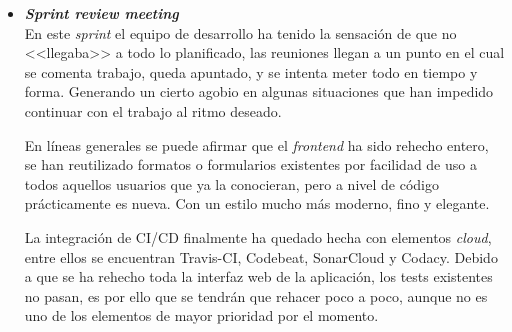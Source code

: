 \begin{itemize}
\item \textbf{\textit{Sprint review meeting}}\\
En este \textit{sprint} el equipo de desarrollo ha tenido la sensación de que no <<llegaba>> a todo lo planificado, las reuniones llegan a un punto en el cual se comenta trabajo, queda apuntado, y se intenta meter todo en tiempo y forma. Generando un cierto agobio en algunas situaciones que han impedido continuar con el trabajo al ritmo deseado.

En líneas generales se puede afirmar que el \textit{frontend} ha sido rehecho entero, se han reutilizado formatos o formularios existentes por facilidad de uso a todos aquellos usuarios que ya la conocieran, pero a nivel de código prácticamente es nueva. Con un estilo mucho más moderno, fino y elegante.

La integración de CI/CD finalmente ha quedado hecha con elementos \textit{cloud}, entre ellos se encuentran Travis-CI, Codebeat, SonarCloud y Codacy. Debido a que se ha rehecho toda la interfaz web de la aplicación, los tests existentes no pasan, es por ello que se tendrán que rehacer poco a poco, aunque no es uno de los elementos de mayor prioridad por el momento.

\end{itemize}

